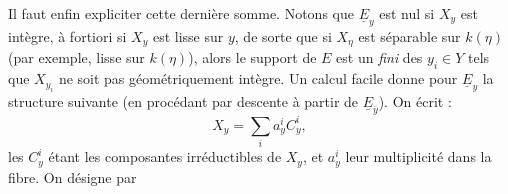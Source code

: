 \documentclass[11pt,a4paper]{article}
\begin{document}
Il faut enfin expliciter cette dernière somme. Notons que
$\underline{E}_{y}$ \struck{\ill{}} est nul si $X_{y}$ est
  intègre, à fortiori si $X_{y}$
est lisse sur $y$, de sorte que si $X_{\eta}$ est séparable sur $k(\eta)$
(par exemple, lisse sur $k(\eta)$), alors le support de $E$ est un
\struck{\ill{}}  \emph{fini}
des $y_{i} \in Y$ tels que $X_{y_{i}}$ ne soit pas géométriquement intègre.
Un calcul facile donne pour $\underline{E}_{y}$ la structure suivante (en
procédant par descente à partir de $\underline{E}_{\bar{y}}$). On écrit
 :
\[
X_{y} = \sum_{i} a_{y}^{i} C_{y}^{i} ,
\tag{4.18}
\]
les $C_{y}^{i}$ étant les composantes irréductibles de $X_{y}$, et 
$a_{y}^{i}$ leur multiplicité dans la fibre. On désigne par

\end{document}
